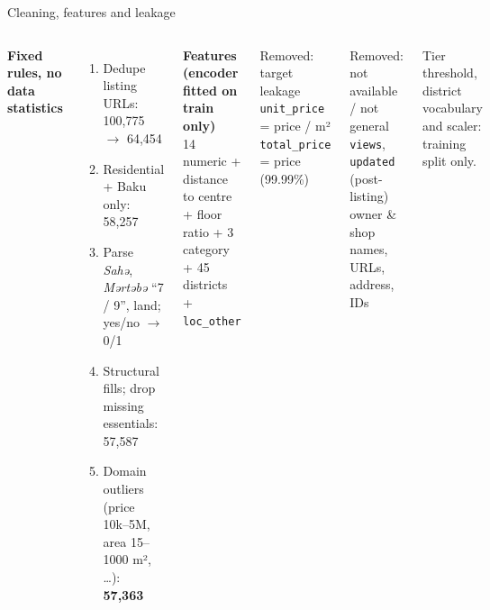 \documentclass[aspectratio=169,11pt]{beamer}
\newcommand{\hi}[1]{\textcolor{accent}{\textbf{#1}}}
\newcommand{\aside}[1]{{\color{muted}\small #1}}
\begin{document}
\begin{frame}{Cleaning, features and leakage}
  \begin{columns}[T]
    \textbf{Fixed rules, no data statistics}
    \begin{enumerate}\small
      \item Dedupe listing URLs: 100,775 $\to$ 64,454
      \item Residential + Baku only: 58,257
      \item Parse \emph{Sahə}, \emph{Mərtəbə} ``7 / 9'', land; yes/no $\to$ 0/1
      \item Structural fills; drop missing essentials: 57,587
      \item Domain outliers (price 10k--5M, area 15--1000 m², \ldots): \hi{57,363}
    \end{enumerate}
    \textbf{Features (encoder fitted on train only)}\\
    \small 14 numeric + distance to centre + floor ratio + 3 category + 45 districts + \texttt{loc\_other}
    \begin{block}{Removed: target leakage}
      \texttt{unit\_price} = price / m²\\
      \texttt{total\_price} = price (99.99\%)
    \end{block}
    \begin{block}{Removed: not available / not general}
      \texttt{views}, \texttt{updated} (post-listing)\\
      owner \& shop names, URLs, address, IDs
    \end{block}
    \aside{Tier threshold, district vocabulary and scaler: training split only.}
  \end{columns}
\end{frame}
\end{document}
